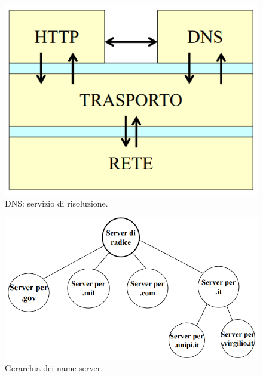 \documentclass[11pt, italian, openany]{book}
\begin{document}
\begin{sloppypar}
\begin{figure}[!h]
	\centering
	\includegraphics[scale=0.25]{images/dns-servizio.png}
	\caption{DNS: servizio di risoluzione.}
	\label{fig:dns-servizio}
\end{figure}
\begin{figure}[!h]
	\centering
	\includegraphics[scale=0.45]{images/dns-gerarchia-nameserver.png}
	\caption{Gerarchia dei name server.}
	\label{fig:dns-nameserver}
\end{figure}


\end{sloppypar}
\end{document}
